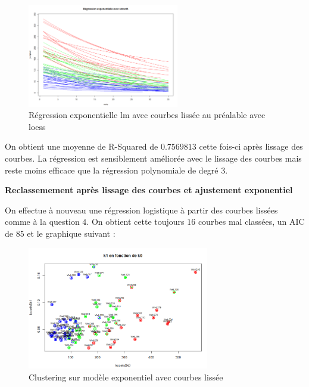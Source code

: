 \documentclass[12pt]{article}
\begin{document}
\begin{figure}[H]
 \centering %
	\includegraphics[width=250px]{reg_exp_smooth_loess}
  \caption{\label{fig:reg_exp_smooth_loess} R\'egression exponentielle lm avec courbes liss\'ee au pr\'ealable avec loess}
\end{figure}

On obtient une moyenne de R-Squared de $0.7569813$ cette fois-ci apr\`es lissage des courbes. La r\'egression est sensiblement am\'elior\'ee avec le lissage des courbes mais reste moins efficace que la r\'egression polynomiale de degr\'e 3.

\newpage

\textbf{Reclassemement apr\`es lissage des courbes et ajustement exponentiel}

On effectue à nouveau une r\'egression logistique à partir des courbes liss\'ees comme à la question $4$.
On obtient cette toujours $16$ courbes mal class\'ees, un AIC de $85$ et le graphique suivant : 

\begin{figure}[H]
 \centering %
	\includegraphics[width=300px]{smooth_clustering_exp}
  \caption{\label{fig:reg_exp_clust} Clustering sur mod\`ele exponentiel avec courbes liss\'ee}
\end{figure}
\end{document}
